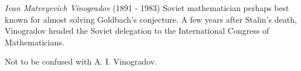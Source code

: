 \documentclass[12pt]{article}
\begin{document}
\emph{Ivan Matveyevich Vinogradov} (1891 - 1983) Soviet mathematician perhaps best known for almost solving Goldbach's conjecture. A few years after Stalin's death, Vinogradov headed the Soviet delegation to the International Congress of Mathematicians.

Not to be confused with A. I. Vinogradov.
\end{document}
